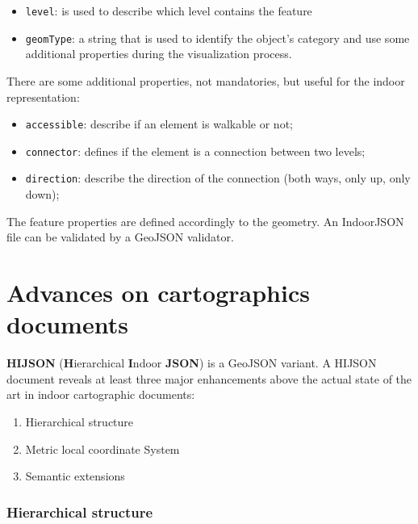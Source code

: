 \documentclass{sig-alternate}
\begin{document}
\begin{itemize}
\itemsep1pt\parskip0pt
\item
  \texttt{level}: is used to describe which level contains the feature
\item
  \texttt{geomType}: a string that is used to identify the object's
  category and use some additional properties during the visualization
  process.
\end{itemize}

There are some additional properties, not mandatories, but useful for
the indoor representation:

\begin{itemize}
\itemsep1pt\parskip0pt
\item
  \texttt{accessible}: describe if an element is walkable or not;
\item
  \texttt{connector}: defines if the element is a connection between two
  levels;
\item
  \texttt{direction}: describe the direction of the connection (both
  ways, only up, only down);
\end{itemize}

The feature properties are defined accordingly to the geometry. An
IndoorJSON file can be validated by a GeoJSON validator.

\section{Advances on cartographics documents}\label{advances-on-cartographics-document}

\textbf{HIJSON} (\textbf{H}ierarchical \textbf{I}ndoor \textbf{JSON}) is
a GeoJSON variant. A HIJSON document reveals at least three major
enhancements above the actual state of the art in indoor cartographic
documents:

\begin{enumerate}
\def\labelenumi{\arabic{enumi}.}
\itemsep1pt\parskip0pt
\item
  Hierarchical structure
\item
  Metric local coordinate System
\item
  Semantic extensions
\end{enumerate}

\subsubsection{Hierarchical structure}\label{hierarchical-structure}
\end{document}
